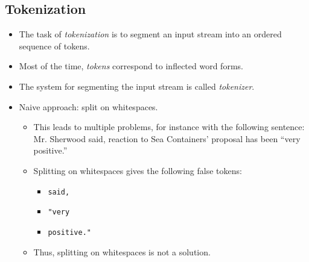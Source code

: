         \subsection{Tokenization} %
            \begin{itemize}
            	\item The task of \textit{tokenization} is to segment an input stream into an ordered sequence of tokens.
            	\item Most of the time, \textit{tokens} correspond to inflected word forms.
            	\item The system for segmenting the input stream is called \textit{tokenizer}.
            	\item Naive approach: split on whitespaces.
            		\begin{itemize}
            			\item This leads to multiple problems, for instance with the following sentence: \\ Mr. Sherwood said, reaction to Sea Containers' proposal has been \enquote{very positive.}
            			\item Splitting on whitespaces gives the following false tokens:
            				\begin{itemize}
            					\item \verb$said,$
            					\item \verb$"very$
            					\item \verb$positive."$
            				\end{itemize}
            			\item Thus, splitting on whitespaces is not a solution.
            		\end{itemize}
            \end{itemize}

